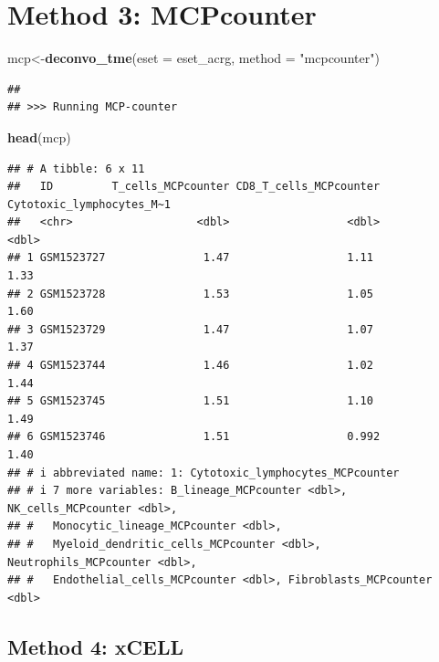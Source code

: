 \documentclass[
  12pt,
]{book}
\newenvironment{Shaded}{\begin{snugshade}}{\end{snugshade}}
\newcommand{\AttributeTok}[1]{\textcolor[rgb]{0.13,0.29,0.53}{#1}}
\newcommand{\FunctionTok}[1]{\textcolor[rgb]{0.13,0.29,0.53}{\textbf{#1}}}
\newcommand{\NormalTok}[1]{#1}
\newcommand{\OtherTok}[1]{\textcolor[rgb]{0.56,0.35,0.01}{#1}}
\newcommand{\StringTok}[1]{\textcolor[rgb]{0.31,0.60,0.02}{#1}}
\theoremstyle{definition}
\theoremstyle{definition}
\theoremstyle{definition}
\theoremstyle{definition}
\theoremstyle{remark}
\begin{document}
\hypertarget{method-3-mcpcounter}{%
\section{Method 3: MCPcounter}\label{method-3-mcpcounter}}

\begin{Shaded}
\begin{Highlighting}[]
\NormalTok{mcp}\OtherTok{\textless{}{-}}\FunctionTok{deconvo\_tme}\NormalTok{(}\AttributeTok{eset =}\NormalTok{ eset\_acrg, }\AttributeTok{method =} \StringTok{"mcpcounter"}\NormalTok{)}
\end{Highlighting}
\end{Shaded}

\begin{verbatim}
## 
## >>> Running MCP-counter
\end{verbatim}

\begin{Shaded}
\begin{Highlighting}[]
\FunctionTok{head}\NormalTok{(mcp)}
\end{Highlighting}
\end{Shaded}

\begin{verbatim}
## # A tibble: 6 x 11
##   ID         T_cells_MCPcounter CD8_T_cells_MCPcounter Cytotoxic_lymphocytes_M~1
##   <chr>                   <dbl>                  <dbl>                     <dbl>
## 1 GSM1523727               1.47                  1.11                       1.33
## 2 GSM1523728               1.53                  1.05                       1.60
## 3 GSM1523729               1.47                  1.07                       1.37
## 4 GSM1523744               1.46                  1.02                       1.44
## 5 GSM1523745               1.51                  1.10                       1.49
## 6 GSM1523746               1.51                  0.992                      1.40
## # i abbreviated name: 1: Cytotoxic_lymphocytes_MCPcounter
## # i 7 more variables: B_lineage_MCPcounter <dbl>, NK_cells_MCPcounter <dbl>,
## #   Monocytic_lineage_MCPcounter <dbl>,
## #   Myeloid_dendritic_cells_MCPcounter <dbl>, Neutrophils_MCPcounter <dbl>,
## #   Endothelial_cells_MCPcounter <dbl>, Fibroblasts_MCPcounter <dbl>
\end{verbatim}

\hypertarget{method-4-xcell}{%
\subsection{Method 4: xCELL}\label{method-4-xcell}}
\end{document}
